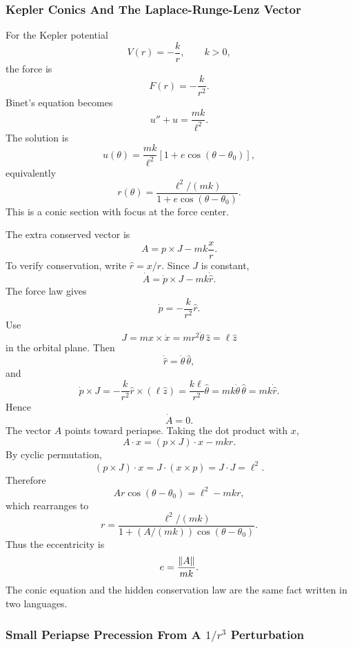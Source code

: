 \subsubsection{Kepler Conics And The Laplace-Runge-Lenz Vector}
\label{subsec:detailed-kepler-lrl}

For the Kepler potential
\[
  V(r)=-\frac{k}{r},
  \qquad
  k>0,
\]
the force is
\[
  F(r)=-\frac{k}{r^2}.
\]
Binet's equation becomes
\[
  u''+u=\frac{mk}{\ell^2}.
\]
The solution is
\[
  u(\theta)=\frac{mk}{\ell^2}\left[1+e\cos(\theta-\theta_0)\right],
\]
equivalently
\[
  r(\theta)=\frac{\ell^2/(mk)}
  {1+e\cos(\theta-\theta_0)}.
\]
This is a conic section with focus at the force center.

The extra conserved vector is
\[
  A=p\times J-mk\frac{x}{r}.
\]
To verify conservation, write \(\hat r=x/r\). Since \(J\) is constant,
\[
  \dot A=\dot p\times J-mk\dot{\hat r}.
\]
The force law gives
\[
  \dot p=-\frac{k}{r^2}\hat r.
\]
Use
\[
  J=mx\times\dot x=mr^2\dot\theta\,\hat z=\ell\hat z
\]
in the orbital plane. Then
\[
  \dot{\hat r}=\dot\theta\,\hat\theta,
\]
and
\[
  \dot p\times J
  =
  -\frac{k}{r^2}\hat r\times(\ell\hat z)
  =
  \frac{k\ell}{r^2}\hat\theta
  =
  mk\dot\theta\,\hat\theta
  =
  mk\dot{\hat r}.
\]
Hence
\[
  \dot A=0.
\]
The vector \(A\) points toward periapse. Taking the dot product with \(x\),
\[
  A\cdot x
  =
  (p\times J)\cdot x-mkr.
\]
By cyclic permutation,
\[
  (p\times J)\cdot x=J\cdot(x\times p)=J\cdot J=\ell^2.
\]
Therefore
\[
  A r\cos(\theta-\theta_0)=\ell^2-mkr,
\]
which rearranges to
\[
  r=\frac{\ell^2/(mk)}{1+(A/(mk))\cos(\theta-\theta_0)}.
\]
Thus the eccentricity is
\[
  e=\frac{\left\lVert A\right\rVert}{mk}.
\]
The conic equation and the hidden conservation law are the same fact written
in two languages.

\subsubsection[Small Periapse Precession]{Small Periapse Precession From A
\texorpdfstring{\(1/r^3\)}{1/r^3} Perturbation}
\label{subsec:detailed-precession}

